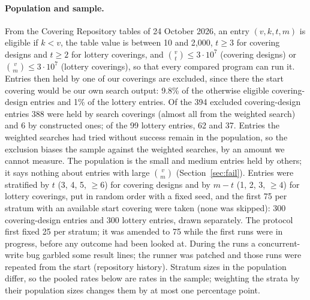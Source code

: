 \documentclass[11pt]{article}
\theoremstyle{remark}
\begin{document}
\paragraph{Population and sample.} From the Covering Repository tables of 24 October 2026, an entry $(v,k,t,m)$ is
eligible if $k<v$, the table value is between 10 and 2{,}000, $t\ge 3$ for covering designs and $t\ge 2$ for lottery
coverings, and $\binom{v}{t}\le 3\cdot 10^7$ (covering designs) or $\binom{v}{m}\le 3\cdot 10^7$ (lottery
coverings), so that every compared program can run it. Entries then held by one of our coverings are excluded, since
there the start covering would be our own search output: 9.8\% of the otherwise eligible covering-design entries and
1\% of the lottery entries. Of the 394 excluded covering-design entries 388 were held by search coverings (almost
all from the weighted search) and 6 by constructed ones; of the 99 lottery entries, 62 and 37. Entries the weighted
searches had tried without success remain in the population, so the exclusion biases the sample against the weighted
searches, by an amount we cannot measure. The population is the small and medium entries held by others; it says
nothing about entries with large $\binom{v}{m}$ (Section~\ref{sec:fail}). Entries were stratified by $t$ (3, 4, 5,
$\ge 6$) for covering designs and by $m-t$ (1, 2, 3, $\ge 4$) for lottery coverings, put in random order with a fixed
seed, and the first 75 per stratum with an available start covering were taken (none was skipped): 300 covering-design
entries and 300 lottery entries, drawn separately. The protocol first fixed 25 per stratum; it was amended to 75 while
the first runs were in progress, before any outcome had been looked at. During the runs a concurrent-write bug garbled
some result lines; the runner was patched and those runs were repeated from the start (repository history). Stratum
sizes in the population differ, so the pooled rates below are rates in the sample; weighting the strata by their
population sizes changes them by at most one percentage point.
\end{document}

